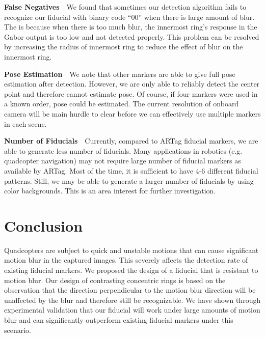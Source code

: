 \documentclass[runningheads]{llncs}
\begin{document}
\noindent\textbf{False Negatives}~~We found that sometimes our detection
algorithm fails to recognize our fiducial with binary code ``00'' when there is
large amount of blur.  The is because when there is too much blur, the innermost
ring's response in the Gabor output is too low and not detected properly.
This problem can be resolved by increasing the radius of innermost ring to
reduce the effect of blur on the innermost ring. 

\noindent\textbf{Pose Estimation}~~We note that other markers are able to give
full pose estimation after detection.  However, we are only able to reliably detect
the center point and therefore cannot estimate pose.  Of course, if four
markers were used in a known order, pose could be estimated. The current
resolution of onboard camera will be main hurdle to clear before we can
effectively use multiple markers in each scene.

\noindent\textbf{Number of Fiducials}~~Currently, compared to ARTag fiducial
markers, we are able to generate less number of fiducials. Many applications in
robotics (e.g. quadcopter navigation) may not require large number of fiducial
markers as available by ARTag.  Most of the time, it is sufficient to have 4-6
different fiducial patterns. Still, we may be able to generate a larger number of
fiducials by using color backgrounds. This is an area interest for further
investigation.

\section{Conclusion}

Quadcopters are subject to quick and unstable motions that can cause significant
motion blur in the captured images. This severely affects the detection rate of
existing fiducial markers. We proposed the design of a fiducial that is
resistant to motion blur. Our design of contrasting concentric rings is based on the
observation that the direction perpendicular to the motion blur direction will
be unaffected by the blur and therefore still be recognizable. We have shown
through experimental validation that our fiducial will work under large
amounts of motion blur and can significantly outperform existing fiducial
markers under this scenario.



\end{document}

